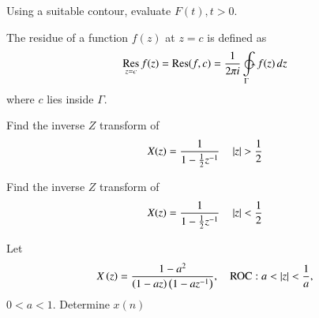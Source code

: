\documentclass[journal,12pt,twocolumn]{IEEEtran}
\begin{document}
\begin{problem}
Using a suitable contour, evaluate $F(t), t > 0$.
\end{problem}
\begin{definition}
The residue of a function $f(z)$ at $z =c$ is defined as
\begin{equation}
\res{z=c}f(z) = \operatorname {Res} (f,c)={1 \over 2\pi i}\ointctrclockwise\limits _{\Gamma }f(z)\,dz
\end{equation}
where $c$ lies inside $\Gamma$.
\end{definition}
\begin{problem}
Find the inverse $Z$ transform of 
\begin{equation}
X(z) = \frac{1}{1-\frac{1}{2}z^{-1}}\quad \left\vert z\right\vert > \frac{1}{2}
\end{equation}
\end{problem}
\begin{problem}
Find the inverse $Z$ transform of 
\begin{equation}
X(z) = \frac{1}{1-\frac{1}{2}z^{-1}}\quad \left\vert z\right\vert < \frac{1}{2}
\end{equation}
\end{problem}
\begin{problem}
Let 
\begin{equation}
X\left(z\right) = \frac{1-a^2}{\left(1-az\right)\left(1-az^{-1}\right)}, \quad \text{ROC}: a < \left\vert z\right\vert < \frac{1}{a}, 
\end{equation}
$0 < a< 1$.  Determine $x(n)$
\end{problem}
\end{document}
